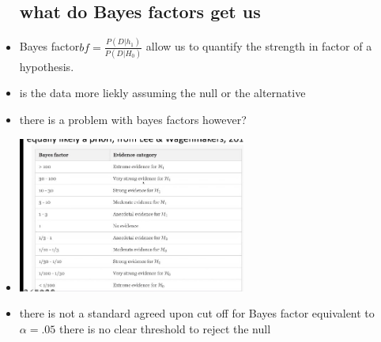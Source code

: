 \documentclass{article}
\begin{document}
\begin{itemize}
\subsection{what do Bayes factors get us }
\item Bayes factor$ bf=\frac{P(D|h_1)}{P(D|H_0)}$ allow us to quantify the strength in factor of a hypothesis. 
\item is the data more liekly assuming the null or the alternative
\item there is a problem with bayes factors however? 
\item  \includegraphics[width=7.5cm]{Final_Review/lecture_6/bayes factor table.jpg}
\item there is not a standard agreed upon cut off for Bayes factor equivalent to $\alpha=.05$ there is no clear threshold to reject the null

\end{itemize}
\end{document}
